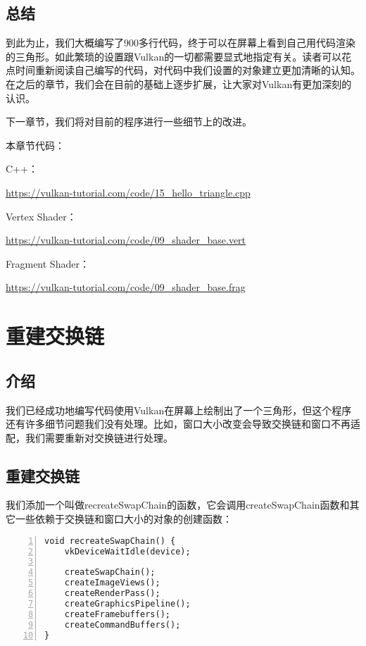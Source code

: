 \documentclass{ctexart}
\begin{document}
\subsection{总结}

到此为止，我们大概编写了900多行代码，终于可以在屏幕上看到自己用代码渲染的三角形。如此繁琐的设置跟Vulkan的一切都需要显式地指定有关。读者可以花点时间重新阅读自己编写的代码，对代码中我们设置的对象建立更加清晰的认知。在之后的章节，我们会在目前的基础上逐步扩展，让大家对Vulkan有更加深刻的认识。

下一章节，我们将对目前的程序进行一些细节上的改进。

本章节代码：

C++：

\url{https://vulkan-tutorial.com/code/15_hello_triangle.cpp}

Vertex Shader：

\url{https://vulkan-tutorial.com/code/09_shader_base.vert}

Fragment Shader：

\url{https://vulkan-tutorial.com/code/09_shader_base.frag}

\newpage
\section{重建交换链}

\subsection{介绍}

我们已经成功地编写代码使用Vulkan在屏幕上绘制出了一个三角形，但这个程序还有许多细节问题我们没有处理。比如，窗口大小改变会导致交换链和窗口不再适配，我们需要重新对交换链进行处理。

\subsection{重建交换链}

我们添加一个叫做recreateSwapChain的函数，它会调用createSwapChain函数和其它一些依赖于交换链和窗口大小的对象的创建函数：

\begin{lstlisting}[language={[ANSI]C},keywordstyle=\color{blue!70},commentstyle=\color{red!50!green!50!blue!50},frame=shadowbox, rulesepcolor=\color{red!20!green!20!blue!20},basicstyle=\small,numbers=left, numberstyle=\tiny,breaklines=true]
void recreateSwapChain() {
	vkDeviceWaitIdle(device);

	createSwapChain();
	createImageViews();
	createRenderPass();
	createGraphicsPipeline();
	createFramebuffers();
	createCommandBuffers();
}
\end{lstlisting}
\end{document}
